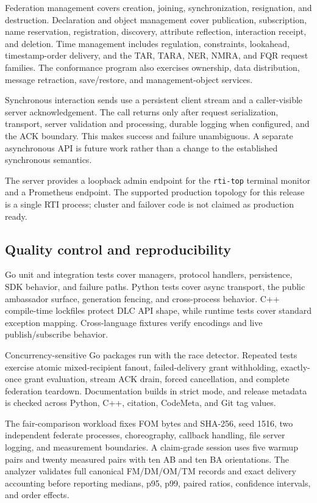 \documentclass[preprint,12pt,a4paper]{elsarticle}
\begin{document}
Federation management covers creation, joining, synchronization, resignation,
and destruction. Declaration and object management cover publication,
subscription, name reservation, registration, discovery, attribute reflection,
interaction receipt, and deletion. Time management includes regulation,
constraints, lookahead, timestamp-order delivery, and the TAR, TARA, NER,
NMRA, and FQR request families. The conformance program also exercises
ownership, data distribution, message retraction, save/restore, and
management-object services.

Synchronous interaction sends use a persistent client stream and a
caller-visible server acknowledgement. The call returns only after request
serialization, transport, server validation and processing, durable logging
when configured, and the ACK boundary. This makes success and failure
unambiguous. A separate asynchronous API is future work rather than a change to
the established synchronous semantics.

The server provides a loopback admin endpoint for the \texttt{rti-top}
terminal monitor and a Prometheus endpoint. The supported production topology
for this release is a single RTI process; cluster and failover code is not
claimed as production ready.

\subsection{Quality control and reproducibility}

Go unit and integration tests cover managers, protocol handlers, persistence,
SDK behavior, and failure paths. Python tests cover async transport, the public
ambassador surface, generation fencing, and cross-process behavior. C++
compile-time lockfiles protect DLC API shape, while runtime tests cover
standard exception mapping. Cross-language fixtures verify encodings and live
publish/subscribe behavior.

Concurrency-sensitive Go packages run with the race detector. Repeated tests
exercise atomic mixed-recipient fanout, failed-delivery grant withholding,
exactly-once grant evaluation, stream ACK drain, forced cancellation, and
complete federation teardown. Documentation builds in strict mode, and release
metadata is checked across Python, C++, citation, CodeMeta, and Git tag values.

The fair-comparison workload fixes FOM bytes and SHA-256, seed 1516, two
independent federate processes, choreography, callback handling, file server
logging, and measurement boundaries. A claim-grade session uses five warmup
pairs and twenty measured pairs with ten AB and ten BA orientations. The
analyzer validates full canonical FM/DM/OM/TM records and exact delivery
accounting before reporting medians, p95, p99, paired ratios, confidence
intervals, and order effects.
\end{document}
